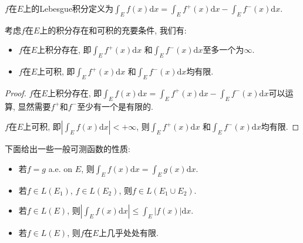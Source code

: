 \documentclass[theorem=false,mathfont=none,openany,sub3section]{easybook}
\begin{document}
\begin{definition}
  $f$在$E$上的Lebesgue积分定义为$\int_{E}f(x)\mathrm{d}x=\int_{E}f^{+}(x)\mathrm{d}x-\int_{E}f^{-}(x)\mathrm{d}x$.\par
\end{definition}

\begin{lemma}
  考虑$f$在$E$上的积分存在和可积的充要条件, 我们有:\par
  \begin{itemize}
    \item $f$在$E$上积分存在, 即$\int_{E}f^{+}(x)\mathrm{d}x$ 和$\int_{E}f^{-}(x)\mathrm{d}x$至多一个为$\infty$.
    \item $f$在$E$上可积, 即$\int_{E}f^{+}(x)\mathrm{d}x$ 和$\int_{E}f^{-}(x)\mathrm{d}x$均有限.
  \end{itemize}
\end{lemma}

\begin{proof}
  $f$在$E$上积分存在, 即$\int_{E}f(x)\mathrm{d}x=\int_{E}f^{+}(x)\mathrm{d}x-\int_{E}f^{-}(x)\mathrm{d}x$可以运算, 显然需要$f^{+}$和$f^{-}$至少有一个是有限的.\par
  $f$在$E$上可积, 即$|\int_{E}f(x)\mathrm{d}x|<+\infty$, 则$\int_{E}f^{+}(x)\mathrm{d}x$ 和$\int_{E}f^{-}(x)\mathrm{d}x$均有限.\par
\end{proof}

下面给出一些一般可测函数的性质:\par

\begin{proposition}
  \begin{itemize}
    \item 若$f=g$ a.e. on $E$, 则$\int_{E}f(x)\mathrm{d}x=\int_{E}g(x)\mathrm{d}x$.\par
    \item 若$f\in L(E_1)$, $f\in L(E_2)$, 则$f\in L(E_1\cup E_2)$.\par
    \item 若$f\in L(E)$, 则$\left|\int_{E}f(x)\mathrm{d}x\right|\leqslant \int_{E}|f(x)|\mathrm{d}x$.\par
    \item 若$f\in L(E)$, 则$f$在$E$上几乎处处有限.\par
  \end{itemize}
\end{proposition}
\end{document}
